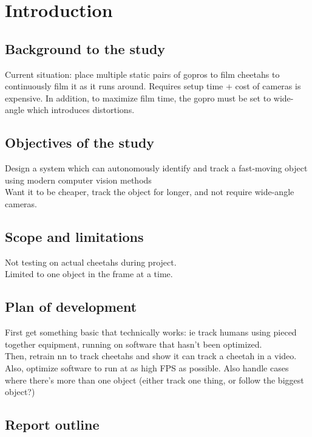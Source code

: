 \section{Introduction}
\subsection{Background to the study}

Current situation: place multiple static pairs of gopros to film cheetahs to continuously film it as it runs around. Requires setup time + cost of cameras is expensive. In addition, to maximize film time, the gopro must be set to wide-angle which introduces distortions.



\subsection{Objectives of the study}
Design a system which can autonomously identify and track a fast-moving object using modern computer vision methods \\
Want it to be cheaper, track the object for longer, and not require wide-angle cameras.


\subsection{Scope and limitations}
Not testing on actual cheetahs during project. \\
Limited to one object in the frame at a time.



\subsection{Plan of development}
First get something basic that technically works: ie track humans using pieced together equipment, running on software that hasn't been optimized. \\
Then, retrain nn to track cheetahs and show it can track a cheetah in a video. Also, optimize software to run at as high FPS as possible. Also handle cases where there's more than one object (either track one thing, or follow the biggest object?)



\subsection{Report outline}


